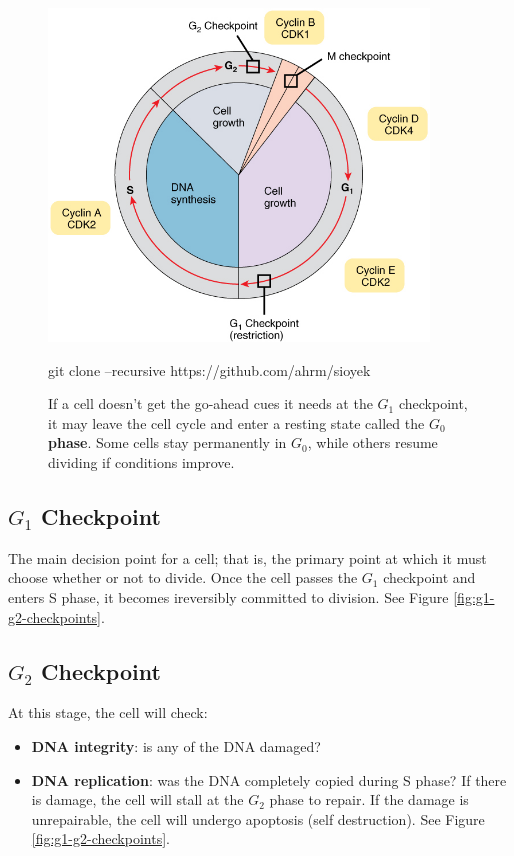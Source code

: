 \documentclass[12pt]{report}
\begin{document}
\begin{figure}[H]
\centering
    \includegraphics[width=0.9\textwidth]{../figures/healthy cell checkpoints.jpg}
    \caption{If a cell doesn't get the go-ahead cues it needs at the $G_1$ checkpoint, it may leave the cell cycle and enter a resting state called the \textbf{ $G_0$ phase}. Some cells stay permanently in $G_0$, while others resume dividing if conditions improve.}git clone --recursive https://github.com/ahrm/sioyek
    \label{fig:healthy-cell-checkpoints}
\end{figure}

\subsection{$G_1$ Checkpoint}
\begin{definition}[$G_1$ Checkpoint]
    The main decision point for a cell; that is, the primary point at which it must choose whether or not to divide. Once the cell passes the $G_1$ checkpoint and enters S phase, it becomes ireversibly committed to division. See Figure \ref{fig:g1-g2-checkpoints}.
\end{definition}

\subsection{$G_2$ Checkpoint}
\begin{definition}[$G_2$ Checkpoint]
    At this stage, the cell will check: 
    \begin{itemize}
        \item{ \textbf{DNA integrity}: is any of the DNA damaged?}
        \item{ \textbf{DNA replication}: was the DNA completely copied during S phase?}
            If there is damage, the cell will stall at the $G_2$ phase to repair. If the damage is unrepairable, the cell will undergo apoptosis (self destruction). See Figure \ref{fig:g1-g2-checkpoints}.
    \end{itemize}
\end{definition}
\end{document}
